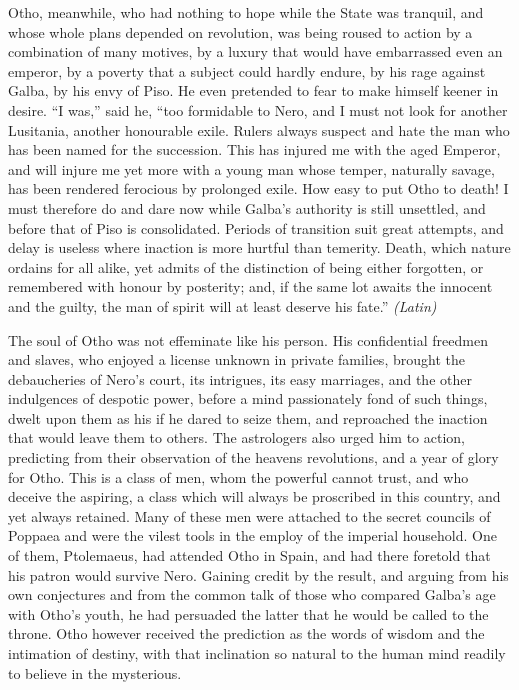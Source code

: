 
Otho, meanwhile, who had nothing to hope while the State was tranquil, and whose whole plans depended on revolution, was being roused to action by a combination of many motives, by a luxury that would have embarrassed even an emperor, by a poverty that a subject could hardly endure, by his rage against Galba, by his envy of Piso. He even pretended to fear to make himself keener in desire. ``I was,'' said he, ``too formidable to Nero, and I must not look for another Lusitania, another honourable exile. Rulers always suspect and hate the man who has been named for the succession. This has injured me with the aged Emperor, and will injure me yet more with a young man whose temper, naturally savage, has been rendered ferocious by prolonged exile. How easy to put Otho to death! I must therefore do and dare now while Galba's authority is still unsettled, and before that of Piso is consolidated. Periods of transition suit great attempts, and delay is useless where inaction is more hurtful than temerity. Death, which nature ordains for all alike, yet admits of the distinction of being either forgotten, or remembered with honour by posterity; and, if the same lot awaits the innocent and the guilty, the man of spirit will at least deserve his fate.'' \emph{(Latin)}


The soul of Otho was not effeminate like his person. His confidential freedmen and slaves, who enjoyed a license unknown in private families, brought the debaucheries of Nero's court, its intrigues, its easy marriages, and the other indulgences of despotic power, before a mind passionately fond of such things, dwelt upon them as his if he dared to seize them, and reproached the inaction that would leave them to others. The astrologers also urged him to action, predicting from their observation of the heavens revolutions, and a year of glory for Otho. This is a class of men, whom the powerful cannot trust, and who deceive the aspiring, a class which will always be proscribed in this country, and yet always retained. Many of these men were attached to the secret councils of Poppaea and were the vilest tools in the employ of the imperial household. One of them, Ptolemaeus, had attended Otho in Spain, and had there foretold that his patron would survive Nero. Gaining credit by the result, and arguing from his own conjectures and from the common talk of those who compared Galba's age with Otho's youth, he had persuaded the latter that he would be called to the throne. Otho however received the prediction as the words of wisdom and the intimation of destiny, with that inclination so natural to the human mind readily to believe in the mysterious.

